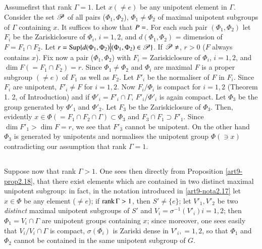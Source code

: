 \subsection{}\label{art9-subsec3.2}
Assume\pageoriginale first that rank $\Gamma = 1$. Let $x (\neq e)$ be any unipotent element in $\Gamma$. Consider the set $\mathscr{P}$ of all pairs ($\Phi_1, \Phi_2$), $\Phi_1 \neq \Phi_2$ of maximal unipotent subgroups of $\Gamma$ containing $x$. It suffices to show that $P=\empty$. For each such pair $(\Phi_1, \Phi_2)$ let $F_i$ be the Zariskiclosure of $\Phi_i$, $i = 1, 2$, and $d (\Phi_1, \Phi_2)$ = dimension of $F = F_1 \cap F_2$. Let $r = \operatorname{Sup} \{d (\Phi_1,\Phi_2) \big| (\Phi_1, \Phi_2) \in \mathscr{P}\}$. If $\sP \neq \empty$, $r > 0$ ($F$ always contains $x$). Fix now a pair ($\Phi_1, \Phi_2$) with $F_i$ = Zariskiclosure of $\Phi_i$, $i = 1, 2$, and $\dim F (= F_1 \cap F_2) = r$. Since $\Phi_1 \neq \Phi_2$ and $\Phi_i$ are maximal $F$ is a proper subgroup $(\neq e)$ of $F_1$ as well as $F_2$. Let $F'_i$ be the normaliser of $F$ in $F_i$. Since $F_i$ are unipotent, $F'_i \neq F$ for $i = 1, 2$. Now $F_i / \Phi_i$ is compact for $i= 1, 2$ (\cf Theorem 1. 2, of Introduction) and if $\Phi'_i = F'_i \cap \Gamma$, $F'_i / \Phi'_i$ is again compact. Let $\Phi_3$ be the group generated by $\Phi'_1$ and $\Phi'_2$. Let $F_3$ be the Zariskiclosure of $\Phi_3$. Then, evidently $x \in \Phi (= F_1 \cap F_2 \cap \Gamma) \subset \Phi_3$ and $F_3 \cap F_1 \supset F'_1$. Since $\dim F'_1 > \dim F = r$, we see that $F'_3$ cannot be unipotent. On the other hand $\Phi_3$ is generated by unipotents  and normalises the unipotent group $\Phi (\ni x)$ contradicting our assumption that rank $\Gamma=1$.

\setcounter{subsection}{2}
\subsection{}\label{art9-subsec3.3}
Suppose now that rank $\Gamma >1$. One sees then directly from Proposition \ref{art9-prop2.18}, that there exist elements which are contained in two distinct maximal unipotent subgroup: in fact, in the notation introduced in \ref{art9-nota2.17} let $x \in \Phi$ be any element ($\neq e$); if $\operatorname{rank} \Gamma > 1$, then $S' \neq \{e\}$; let $V'_1, V'_2$ be two \textit{distinct} maximal unipotent subgroups of $S'$ and $V_i = \sigma^{-1} (V'_i) i = 1, 2$; then $\Phi_1 = V_i \cap \Gamma$ are unipotent groups containing $x$; since moreover, one sees easily that $V_i / V_i \cap \Gamma$ is compact, $\sigma (\Phi_i)$ is Zariski dense in $V'_i, = 1, 2$, so that $\Phi_1$ and $\Phi_2$ cannot be contained in the same unipotent subgroup of $G$.

